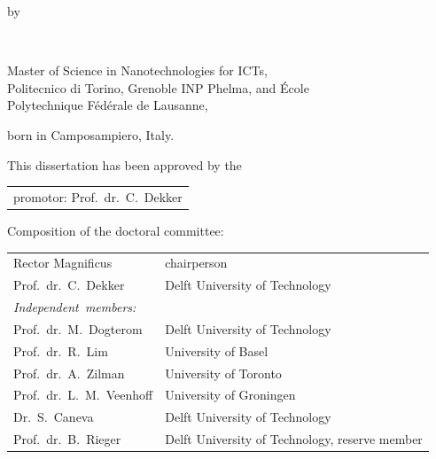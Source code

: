 \begin{titlepage}
\begin{center}

\bigskip
\bigskip

by

\bigskip
\bigskip

\makeatletter
{\Large\titlefont\bfseries\@firstname\ {\titleshape\@lastname}}
\makeatother

\bigskip
\bigskip

Master of Science in Nanotechnologies for ICTs, \\
Politecnico di Torino, Grenoble INP Phelma, and \'{E}cole  \\ Polytechnique F\'{e}d\'{e}rale de Lausanne,

born in Camposampiero, Italy.

\vspace*{2\bigskipamount}

\end{center}

\clearpage
\thispagestyle{empty}

\noindent This dissertation has been approved by the

\medskip\noindent
\begin{tabular}{l}
    promotor: Prof.\ dr.\ C.\ Dekker \\
\end{tabular}

\bigskip
\noindent Composition of the doctoral committee:

\medskip\noindent
\begin{tabular}{p{5cm}l}
    Rector Magnificus & chairperson \\
    Prof.\ dr.\ C.\ Dekker & Delft University of Technology \\

    \medskip
    \mbox{\emph{Independent members:}} & \\

    Prof.\ dr.\ M.\ Dogterom & Delft University of Technology  \\
    Prof.\ dr.\ R.\ Lim & University of Basel \\
    Prof.\ dr.\ A.\ Zilman & University of Toronto \\
    Prof.\ dr.\ L.\ M.\ Veenhoff &  University of Groningen \\
    Dr.\ S.\ Caneva & Delft University of Technology \\
    Prof.\ dr.\ B.\ Rieger & Delft University of Technology, reserve member  \\


\end{tabular}
\end{titlepage}
